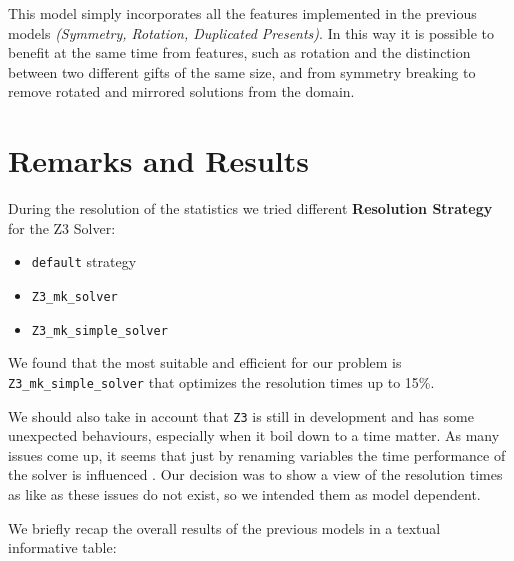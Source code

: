 This model simply incorporates all the features implemented in the previous models \textit{(Symmetry, Rotation, Duplicated Presents)}.
In this way it is possible to benefit at the same time from features, such as rotation and the distinction between two different gifts of the same size,
and from symmetry breaking to remove rotated and mirrored solutions from the domain.  




\newpage
\section{Remarks and Results}
During the resolution of the statistics we tried different \textbf{Resolution Strategy} for the Z3 Solver:
\begin{itemize}
	\item \texttt{default} strategy
	\item \texttt{Z3\_mk\_solver}
	\item \texttt{Z3\_mk\_simple\_solver}
\end{itemize}
We found that the most suitable and efficient for our problem is \texttt{Z3\_mk\_simple\_solver} that optimizes the resolution times up to 15\%.

We should also take in account that \texttt{Z3} is still in development and has some unexpected behaviours, especially when it boil down to a time matter.
As many issues come up, it seems that just by renaming variables the time performance of the solver is influenced \cite{z3issues}.
Our decision was to show a view of the resolution times as like as these issues do not exist, so we intended them as model dependent.

We briefly recap the overall results of the previous models in a textual informative table:

